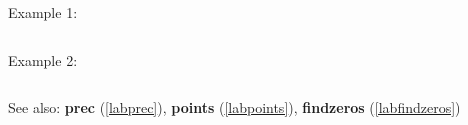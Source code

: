 \noindent Example 1: 
\begin{center}\begin{minipage}{15cm}\begin{Verbatim}[frame=single]
\end{Verbatim}
\end{minipage}\end{center}
\noindent Example 2: 
\begin{center}\begin{minipage}{15cm}\begin{Verbatim}[frame=single]
\end{Verbatim}
\end{minipage}\end{center}
See also: \textbf{prec} (\ref{labprec}), \textbf{points} (\ref{labpoints}), \textbf{findzeros} (\ref{labfindzeros})
